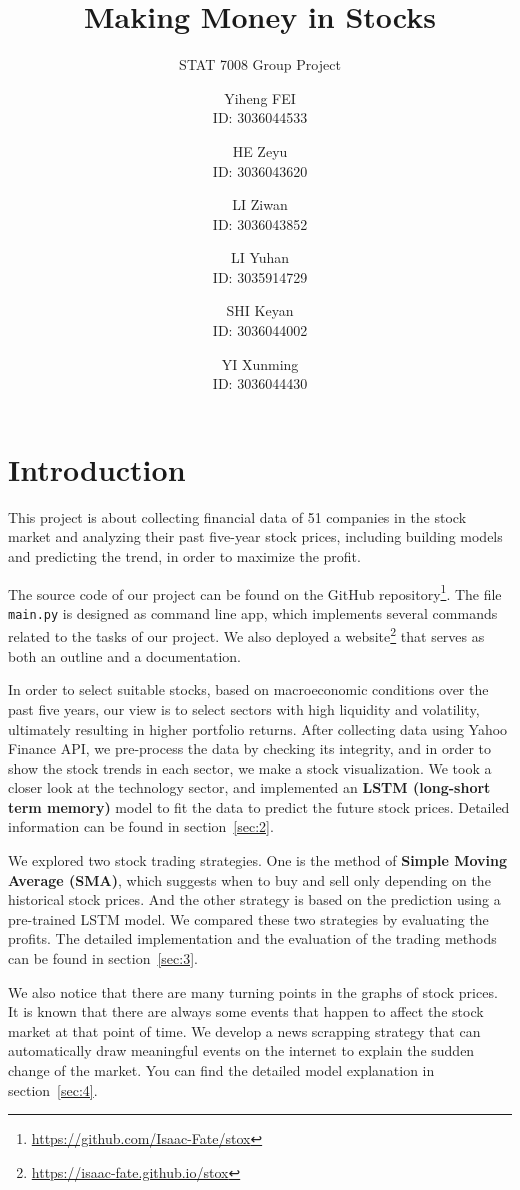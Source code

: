 \documentclass[a4paper, 11pt]{my-elegantpaper}
\title{Making Money in Stocks}
\subtitle{STAT 7008 Group Project}
\author{
    Yiheng FEI \\ ID: 3036044533
    \and
    HE Zeyu \\ ID: 3036043620
    \and
    LI Ziwan \\ ID: 3036043852
    \and
    LI Yuhan \\ ID: 3035914729
    \and
    SHI Keyan \\ ID: 3036044002
    \and
    YI Xunming \\ ID: 3036044430
}
\begin{document}
\maketitle

\tableofcontents

\section{Introduction}

This project is about collecting financial data of 51 companies in the stock market and analyzing their past five-year stock prices, including building models and predicting the trend, in order to maximize the profit.

The source code of our project can be found on the GitHub repository\footnote{\url{https://github.com/Isaac-Fate/stox}}. The file \texttt{main.py} is designed as command line app, which implements several commands related to the tasks of our project. We also deployed a website\footnote{\url{https://isaac-fate.github.io/stox}} that serves as both an outline and a documentation.

In order to select suitable stocks, based on macroeconomic conditions over the past five years, our view is to select sectors with high liquidity and volatility, ultimately resulting in higher portfolio returns. After collecting data using Yahoo Finance API, we pre-process the data by checking its integrity, and in order to show the stock trends in each sector, we make a stock visualization. We took a closer look at the technology sector, and implemented an \textbf{LSTM (long-short term memory)} model to fit the data to predict the future stock prices. Detailed information can be found in section~\ref{sec:2}. 

We explored two stock trading strategies. One is the method of \textbf{Simple Moving Average (SMA)}, which suggests when to buy and sell only depending on the historical stock prices. And the other strategy is based on the prediction using a pre-trained LSTM model. We compared these two strategies by evaluating the profits. The detailed implementation and the evaluation of the trading methods can be found in section~\ref{sec:3}. 

We also notice that there are many turning points in the graphs of stock prices. It is known that there are always some events that happen to affect the stock market at that point of time. We develop a news scrapping strategy that can automatically draw meaningful events on the internet to explain the sudden change of the market. You can find the detailed model explanation in section~\ref{sec:4}.
\end{document}
